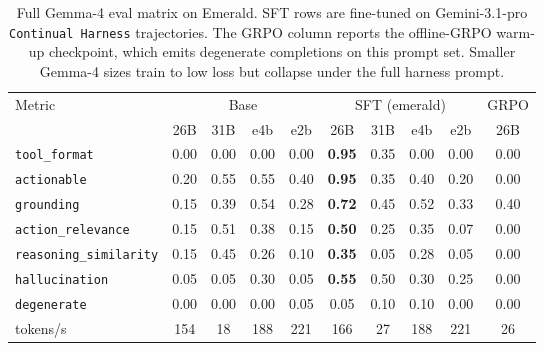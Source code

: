 \begin{table}[t]
\centering
\scriptsize
\setlength{\tabcolsep}{3pt}
\caption{Full Gemma-4 eval matrix on Emerald. SFT rows are fine-tuned on Gemini-3.1-pro \texttt{Continual Harness} trajectories. The GRPO column reports the offline-GRPO warm-up checkpoint, which emits degenerate completions on this prompt set. Smaller Gemma-4 sizes train to low loss but collapse under the full harness prompt.}
\label{tab:h6_eval_full_emerald}
\begin{tabular}{lccccccccc}
\toprule
Metric & \multicolumn{4}{c}{Base} & \multicolumn{4}{c}{SFT (emerald)} & GRPO \\
\cmidrule(lr){2-5} \cmidrule(lr){6-9} \cmidrule(lr){10-10}
       & 26B & 31B & e4b & e2b & 26B & 31B & e4b & e2b & 26B \\
\midrule
\texttt{tool\_format}          & 0.00 & 0.00 & 0.00 & 0.00 & \textbf{0.95} & 0.35 & 0.00 & 0.00 & 0.00 \\
\texttt{actionable}            & 0.20 & 0.55 & 0.55 & 0.40 & \textbf{0.95} & 0.35 & 0.40 & 0.20 & 0.00 \\
\texttt{grounding}             & 0.15 & 0.39 & 0.54 & 0.28 & \textbf{0.72} & 0.45 & 0.52 & 0.33 & 0.40 \\
\texttt{action\_relevance}     & 0.15 & 0.51 & 0.38 & 0.15 & \textbf{0.50} & 0.25 & 0.35 & 0.07 & 0.00 \\
\texttt{reasoning\_similarity} & 0.15 & 0.45 & 0.26 & 0.10 & \textbf{0.35} & 0.05 & 0.28 & 0.05 & 0.00 \\
\texttt{hallucination}         & 0.05 & 0.05 & 0.30 & 0.05 & \textbf{0.55} & 0.50 & 0.30 & 0.25 & 0.00 \\
\texttt{degenerate}            & 0.00 & 0.00 & 0.00 & 0.05 & 0.05 & 0.10 & 0.10 & 0.00 & 0.00 \\
tokens/s                       & 154 & 18 & 188 & 221 & 166 & 27 & 188 & 221 & 26 \\
\bottomrule
\end{tabular}
\end{table}
